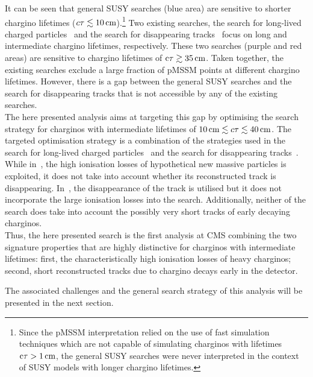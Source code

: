 It can be seen that general SUSY searches (blue area) are sensitive to shorter chargino lifetimes ($c\tau \lesssim 10\,\text{cm}$).\footnote{Since the pMSSM interpretation relied on the use of fast simulation techniques which are not capable of simulating charginos with lifetimes $\text{c}\tau>1\,\text{cm}$, the general SUSY searches were never interpreted in the context of SUSY models with longer chargino lifetimes.} 
Two existing searches, the search for long-lived charged particles~\cite{bib:CMS:HSCP_8TeV} and the search for disappearing tracks~\cite{bib:CMS:DT_8TeV} focus on long and intermediate chargino lifetimes, respectively. 
These two searches (purple and red areas) are sensitive to chargino lifetimes of $\text{c}\tau \gtrsim 35\,\text{cm}$.
Taken together, the existing searches exclude a large fraction of pMSSM points at different chargino lifetimes. 
However, there is a gap between the general SUSY searches and the search for disappearing tracks that is not accessible by any of the existing searches.\\

The here presented analysis aims at targeting this gap by optimising the search strategy for charginos with intermediate lifetimes of $10\,\text{cm} \lesssim c\tau \lesssim 40\,\text{cm}$. 
The targeted optimisation strategy is a combination of the strategies used in the search for long-lived charged particles~\cite{bib:CMS:HSCP_8TeV} and the search for disappearing tracks~\cite{bib:CMS:DT_8TeV}.
While in~\cite{bib:CMS:HSCP_8TeV}, the high ionisation losses of hypothetical new massive particles is exploited, it does not take into account whether its reconstructed track is disappearing.
In~\cite{bib:CMS:DT_8TeV}, the disappearance of the track is utilised but it does not incorporate the large ionisation losses into the search.
Additionally, neither of the search does take into account the possibly very short tracks of early decaying charginos.\\

Thus, the here presented search is the first analysis at CMS combining the two signature properties that are highly distinctive for charginos with intermediate lifetimes: 
first, the characteristically high ionisation losses of heavy charginos;
second, short reconstructed tracks due to chargino decays early in the detector. 

The associated challenges and the general search strategy of this analysis will be presented in the next section.

